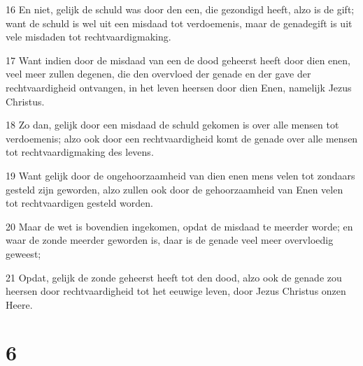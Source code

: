 \par 16 En niet, gelijk de schuld was door den een, die gezondigd heeft, alzo is de gift; want de schuld is wel uit een misdaad tot verdoemenis, maar de genadegift is uit vele misdaden tot rechtvaardigmaking.
\par 17 Want indien door de misdaad van een de dood geheerst heeft door dien enen, veel meer zullen degenen, die den overvloed der genade en der gave der rechtvaardigheid ontvangen, in het leven heersen door dien Enen, namelijk Jezus Christus.
\par 18 Zo dan, gelijk door een misdaad de schuld gekomen is over alle mensen tot verdoemenis; alzo ook door een rechtvaardigheid komt de genade over alle mensen tot rechtvaardigmaking des levens.
\par 19 Want gelijk door de ongehoorzaamheid van dien enen mens velen tot zondaars gesteld zijn geworden, alzo zullen ook door de gehoorzaamheid van Enen velen tot rechtvaardigen gesteld worden.
\par 20 Maar de wet is bovendien ingekomen, opdat de misdaad te meerder worde; en waar de zonde meerder geworden is, daar is de genade veel meer overvloedig geweest;
\par 21 Opdat, gelijk de zonde geheerst heeft tot den dood, alzo ook de genade zou heersen door rechtvaardigheid tot het eeuwige leven, door Jezus Christus onzen Heere.

\chapter{6}

